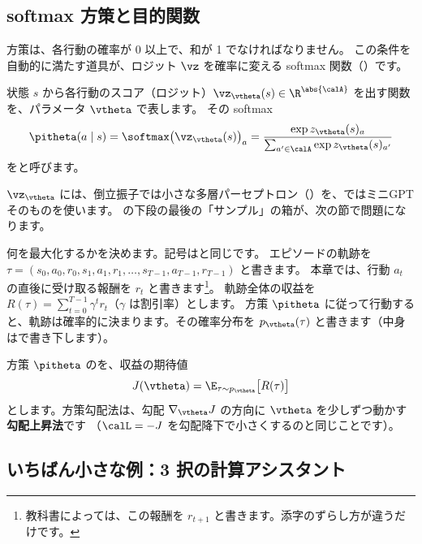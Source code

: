 \subsection*{softmax 方策と目的関数}

方策は、各行動の確率が 0 以上で、和が 1 でなければなりません。
この条件を自動的に満たす道具が、ロジット $\vz$ を確率に変える softmax 関数（）です。

\begin{definition}[softmax 方策]\label{def:pg-softmax-policy}
状態 $s$ から各行動のスコア（ロジット）$\vz_{\vtheta}(s)\in\R^{\abs{\calA}}$ を出す関数を、パラメータ $\vtheta$ で表します。
その softmax
\begin{equation}
\pitheta(a\mid s)=\softmax\bigl(\vz_{\vtheta}(s)\bigr)_a=\frac{\exp z_{\vtheta}(s)_a}{\sum_{a'\in\calA}\exp z_{\vtheta}(s)_{a'}}
\label{eq:pg-softmax-policy}
\end{equation}
をと呼びます。
\end{definition}

$\vz_{\vtheta}$ には、倒立振子では小さな多層パーセプトロン（）を、ではミニGPT そのものを使います。
の下段の最後の「サンプル」の箱が、次の節で問題になります。

何を最大化するかを決めます。記号はと同じです。
エピソードの軌跡を $\tau=(s_0,a_0,r_0,s_1,a_1,r_1,\dots,s_{T-1},a_{T-1},r_{T-1})$ と書きます。
本章では、行動 $a_t$ の直後に受け取る報酬を $r_t$ と書きます\footnote{教科書によっては、この報酬を $r_{t+1}$ と書きます。添字のずらし方が違うだけです。}。
軌跡全体の収益を $R(\tau)=\sum_{t=0}^{T-1}\gamma^{t}r_t$（$\gamma$ は割引率）とします。
方策 $\pitheta$ に従って行動すると、軌跡は確率的に決まります。その確率分布を $p_{\vtheta}(\tau)$ と書きます（中身はで書き下します）。

\begin{definition}[方策の目的関数]\label{def:pg-objective}
方策 $\pitheta$ のを、収益の期待値
\begin{equation}
J(\vtheta)=\E_{\tau\sim p_{\vtheta}}\bigl[R(\tau)\bigr]
\label{eq:pg-objective}
\end{equation}
とします。方策勾配法は、勾配 $\nabla_{\vtheta}J$ の方向に $\vtheta$ を少しずつ動かす\textbf{勾配上昇法}です
（$\calL=-J$ を勾配降下で小さくするのと同じことです）。
\end{definition}

\subsection*{いちばん小さな例：3 択の計算アシスタント}

